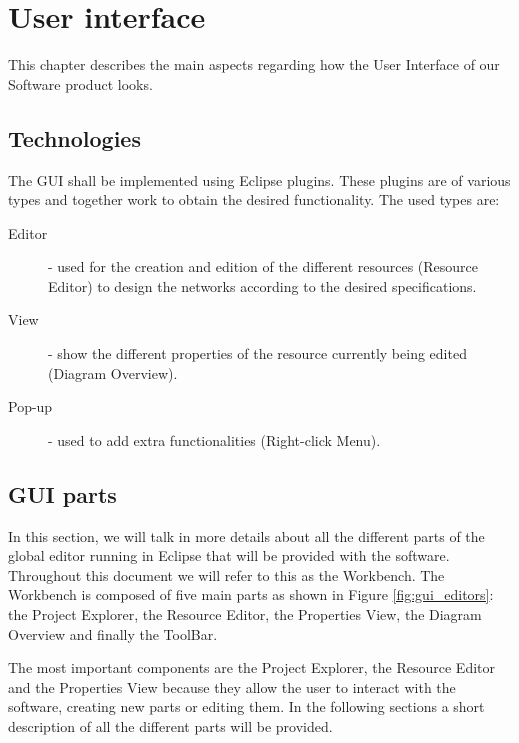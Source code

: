 \section{User interface}
This chapter describes the main aspects regarding how the User Interface of our Software product looks.

\subsection{Technologies}
The GUI shall be implemented using Eclipse plugins. These plugins are of various types and together work to obtain the desired functionality. The used types are:

\begin{description}
  \item[Editor] - used for the creation and edition of the different resources (Resource Editor) to design the networks according to the desired specifications.
  \item[View] - show the different properties of the resource currently being edited (Diagram Overview).
  \item[Pop-up] - used to add extra functionalities (Right-click Menu).
\end{description}

\subsection{GUI parts}
In this section, we will talk in more details about all the different parts of the global editor running in Eclipse that will be provided with the software. Throughout this document we will refer to this as the Workbench. The Workbench is composed of five main parts as shown in Figure \ref{fig:gui_editors}: the Project Explorer, the Resource Editor, the Properties View, the Diagram Overview and finally the ToolBar.

The most important components are the Project Explorer, the Resource Editor and the Properties View because they allow the user to interact with the software, creating new parts or editing them. In the following sections a short description of all the different parts will be provided.

